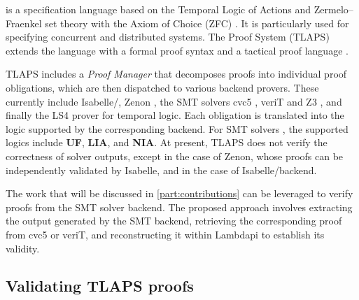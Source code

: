\tlaplus is a specification language based on the Temporal Logic of Actions and Zermelo–Fraenkel set theory with the Axiom of Choice (ZFC) \cite{tlabook,tla-ref}.
It is particularly used for specifying concurrent and distributed systems.
The \tlaplus Proof System (TLAPS) extends the language with a formal proof syntax and a tactical proof language \cite{tla-proofs}.

TLAPS includes a \emph{Proof Manager} that decomposes proofs into individual proof obligations, which are then dispatched to various backend provers.
These currently include Isabelle/\tlaplus \cite{isabelle-hol-ref}, Zenon \cite{zenonmodulo},
the SMT solvers cvc5 \cite{cvc5}, veriT \cite{verit} and Z3 \cite{z3}, and finally the LS4 prover for temporal logic.
Each obligation is translated into the logic supported by the corresponding backend.
For SMT solvers \cite{new-encoding-tlaps}, the supported logics include \textbf{UF}, \textbf{LIA}, and \textbf{NIA}.
At present, TLAPS does not verify the correctness of solver outputs, except in the case of Zenon, whose proofs can be independently validated by Isabelle,
and in the case of Isabelle/\tlaplus backend.

The work that will be discussed in \cref{part:contributions}  can be leveraged to verify \tlaplus proofs from the SMT solver backend.
The proposed approach involves extracting the output generated by the SMT backend, retrieving the corresponding proof from cvc5 or veriT, and reconstructing it within Lambdapi to establish its validity.
 

\subsection{Validating TLAPS proofs}
\label{sec:validating-tlaps-proof}

